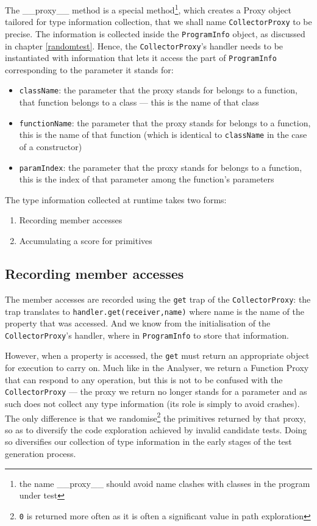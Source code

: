 The \_\_proxy\_\_ method is a special method\footnote{the name \_\_proxy\_\_ should avoid name clashes with classes in the program under test}, which creates a Proxy object tailored for type information collection, that we shall name \texttt{CollectorProxy} to be precise. The information is collected inside the \texttt{ProgramInfo} object, as discussed in chapter \ref{randomtest}. Hence, the \texttt{CollectorProxy}'s handler needs to be instantiated with information that lets it access the part of \texttt{ProgramInfo} corresponding to the parameter it stands for:

\begin{itemize}
   \item \texttt{className}: the parameter that the proxy stands for belongs to a function, that function belongs to a class --- this is the name of that class
   \item \texttt{functionName}: the parameter that the proxy stands for belongs to a function, this is the name of that function (which is identical to \texttt{className} in the case of a constructor)
   \item \texttt{paramIndex}: the parameter that the proxy stands for belongs to a function, this is the index of that parameter among the function's parameters
\end{itemize}

The type information collected at runtime takes two forms:

\begin{enumerate}
   \item Recording member accesses
   \item Accumulating a score for primitives
\end{enumerate}

\subsection{Recording member accesses}
The member accesses are recorded using the \texttt{get} trap of the \texttt{CollectorProxy}: the trap translates to \texttt{handler.get(receiver,name)} where name is the name of the property that was accessed. And we know from the initialisation of the \texttt{CollectorProxy}'s handler, where in \texttt{ProgramInfo} to store that information.

However, when a property is accessed, the \texttt{get} must return an appropriate object for execution to carry on. Much like in the \textsf{Analyser}, we return a Function Proxy that can respond to any operation, but this is not to be confused with the \texttt{CollectorProxy} --- the proxy we return no longer stands for a parameter and as such does not collect any type information (its role is simply to avoid crashes). The only difference is that we randomise\footnote{\texttt{0} is returned more often as it is often a significant value in path exploration} the primitives returned by that proxy, so as to diversify the code exploration achieved by invalid candidate tests. Doing so diversifies our collection of type information in the early stages of the test generation process.

